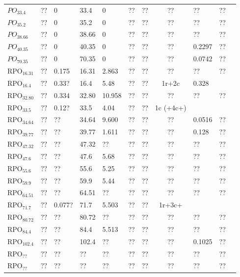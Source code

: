 \documentclass[aip,cha,showpacs,reprint]{revtex4-1} %
\newcommand{\ExpaEig}{\ensuremath{\Lambda}}
\newcommand{\eigRe}[1][]{
\ifthenelse{\equal{#1}{}}{\ensuremath{\mu}}{\ensuremath{\mu^{(#1)}}}
                        }
\newcommand{\shift}{\ensuremath{d}}
\newcommand{\PO}[1]{\ensuremath{PO_{#1}}}
\newcommand{\RPO}[1]{\ensuremath{\mathrm{RPO}_{#1}}}
\begin{document}
\begin{table}
\begin{tabular}{lclllllclll}
   $\PO{33.4}$  & ?? & $0$ & 33.4 & 0 & ?? & ?? & ?? & ?? & ?? \\
   $\PO{35.2}$  & ?? & $0$ & 35.2 & 0 & ?? & ?? & ?? & ?? & ?? \\
   $\PO{38.66}$  & ?? & $0$ & 38.66 & 0 & ?? & ?? & ?? & ?? & ?? \\
   $\PO{40.35}$  & ?? & $0$ & 40.35 & 0 & ?? & ?? & ?? & 0.2297 & ?? \\
   $\PO{70.35}$ & $??$ & $0$ & 70.35 & 0 & ?? & ?? & ?? & 0.0742 & ??  \\
   $\RPO{16.31}$ & $??$ & 0.175 & 16.31 & 2.863 & ?? & ?? & ?? & ?? & ??  \\
   $\RPO{16.4}$ & $??$ & 0.33?    & 16.4 & 5.48 & ?? & ?? & 1r+2c & 0.328 \\
   $\RPO{32.80}$ & $??$ & 0.334 & 32.80 & 10.958 & ?? & ?? & ?? & ?? & ??  \\
   $\RPO{33.5}$ & $??$ & 0.12? & 33.5 & 4.04 & ?? & ?? & 1c (+4c+) \\
   $\RPO{34.64}$ & $??$ & ?? & 34.64 & 9.600 & ?? & ?? & ?? & 0.0516 & ??  \\
   $\RPO{39.77}$ & $??$ & ?? & 39.77 & 1.611 & ?? & ?? & ?? & 0.128 & ??  \\
   $\RPO{47.32}$ & $??$ & ?? & 47.32 & ?? & ?? & ?? & ?? & ?? & ??  \\
   $\RPO{47.6}$  & $??$ & ?? & 47.6  & 5.68 & ?? & ?? & ?? & ?? & ??  \\
   $\RPO{55.6}$ & $??$ & ?? & 55.6 & 5.25 & ?? & ?? & ?? & ?? & ??  \\
   $\RPO{59.9}$ & $??$ & ?? & 59.9 & 5.44 & ?? & ?? & ?? & ?? & ??  \\
   $\RPO{64.51}$ & $??$ & ?? & 64.51 & ?? & ?? & ?? & ?? & ?? & ??  \\
   $\RPO{71.7}$ & $??$ & 0.077? & 71.7 & 5.503 & ?? & ?? & 1r+3c+  \\
   $\RPO{80.72}$ & $??$ & ?? & 80.72 & ?? & ?? & ?? & ?? & ?? & ??  \\
   $\RPO{84.4}$  & $??$ & ?? & 84.4  & 5.513 & ?? & ?? & ?? & ?? & ??  \\
   $\RPO{102.4}$ & $??$ & ?? & 102.4 & ?? & ?? & ?? & ?? & 0.1025 & ??  \\
   $\RPO{??}$ & $??$ & ?? & ?? & ?? & ?? & ?? & ?? & ?? & ??  \\
   $\RPO{??}$ & $??$ & ?? & ?? & ?? & ?? & ?? & ?? & ?? & ??
   \end{tabular}
\end{table}
\end{document}
